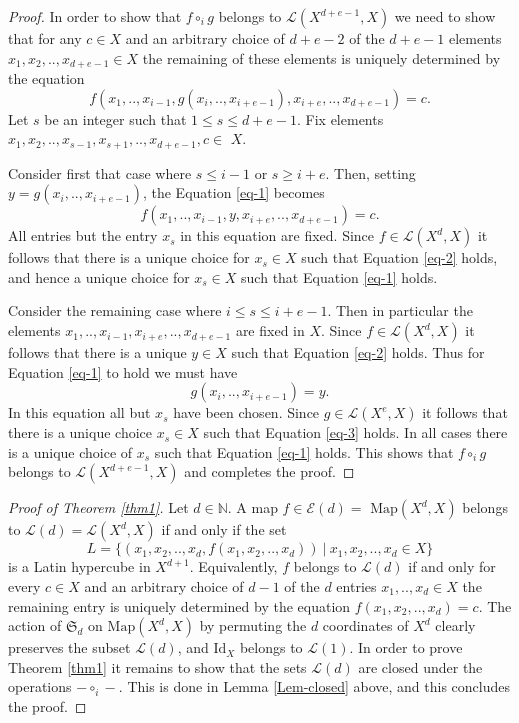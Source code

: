 \documentclass{amsart} %
\theoremstyle{plain}\newtheorem{Theorem}{Theorem}[section]
\theoremstyle{plain}\newtheorem{Conjecture}[Theorem]{Conjecture}
\theoremstyle{plain}\newtheorem{Corollary}[Theorem]{Corollary}
\theoremstyle{plain}\newtheorem{Lemma}[Theorem]{Lemma}
\theoremstyle{plain}\newtheorem{Proposition}[Theorem]{Proposition}
\theoremstyle{definition}\newtheorem{Definition}[Theorem]{Definition}
\theoremstyle{definition}\newtheorem{Example}[Theorem]{Example}
\theoremstyle{definition}\newtheorem{Examples}[Theorem]{Examples}
\theoremstyle{definition}\newtheorem{Remark}[Theorem]{Remark}
\theoremstyle{definition}\newtheorem{Remarks}[Theorem]{Remarks}
\theoremstyle{plain}\newtheorem{Statement}[Theorem]{}
\def\CE{{\mathcal{E}}}    \def\OR{{\mathcal{O}R}}
\def\CL{{\mathcal{L}}}  \def\bCL{{\mathbf{L}}}
\def\N{{\mathbb N}}
\def\Id{\mathrm{Id}}             \def\tenA{\otimes_A}
\def\Map{\mathrm{Map}}
\def\sym{\mathfrak{S}} %
\begin{document}
\begin{proof}
In order to show that
$f\circ_i g$ belongs to $\CL(X^{d+e-1},X)$ we need to show that for any $c\in X$
and an arbitrary choice of $d+e-2$ of the $d+e-1$ elements $x_1,x_2,..,x_{d+e-1}\in X$
the remaining of these elements is uniquely determined by the equation
\begin{equation}  \label{eq-1}
f(x_1,..,x_{i-1}, g(x_i,..,x_{i+e-1}), x_{i+e},..,x_{d+e-1}) = c.
\end{equation}
Let $s$ be an integer such that $1\leq s\leq d+e-1$. Fix elements
$x_1,x_2,..,x_{s-1}, x_{s+1},..,x_{d+e-1}, c \in$ $X$. 

Consider first that case where $s\leq i-1$ or $s\geq i+e$.
Then, setting $y=g(x_i,..,x_{i+e-1})$, the
Equation \ref{eq-1} becomes
\begin{equation} \label{eq-2}
f(x_1,..,x_{i-1},y,x_{i+e},..,x_{d+e-1}) = c.
\end{equation}
All entries  but the entry $x_s$ in this equation are fixed. Since $f\in\CL(X^d,X)$ it follows
that there is a unique choice for $x_s\in X$ such that Equation \ref{eq-2} holds, and
hence a unique choice for $x_s\in X$ such that Equation \ref{eq-1} holds.

Consider the remaining case where $i\leq s \leq i+e-1$. Then in particular the
elements $x_1,..,x_{i-1}, x_{i+e},..,x_{d+e-1}$ are fixed in $X$.
Since $f\in\CL(X^d,X)$ it follows that there is a unique $y\in X$ such that
Equation \ref{eq-2} holds.  Thus for Equation \ref{eq-1} to hold we must have
\begin{equation} \label{eq-3}
g(x_i,..,x_{i+e-1}) = y.
\end{equation}
In this equation all but $x_s$ have been chosen. Since $g\in\CL(X^e,X)$ it follows
that there is a unique choice $x_s\in X$ such that Equation \ref{eq-3} holds.
In all cases there is a unique choice of $x_s$ such that Equation \ref{eq-1} holds.
This shows that $f\circ_i g$ belongs to $\CL(X^{d+e-1},X)$ and completes the proof.
\end{proof}

\begin{proof}[{Proof of Theorem \ref{thm1}}]
Let $d\in \N$.  A map $f\in\CE(d)=$ $\Map(X^d,X)$ 
belongs to $\CL(d)=\CL(X^d,X)$ if and only if  the set 
$$L = \{(x_1,x_2,..,x_d, f(x_1,x_2,..,x_d))\ |\ x_1,x_2,..,x_d \in X\}$$
is a Latin hypercube in $X^{d+1}$. Equivalently, $f$ belongs to $\CL(d)$ if and only
for every  $c\in X$ and an arbitrary  choice of $d-1$ of the $d$ 
entries $x_1,..,x_d\in X$ the remaining entry is uniquely determined by the equation
$f(x_1,x_2,..,x_d)=c$. 
The action of $\sym_d$ on $\Map(X^d,X)$
by permuting the $d$ coordinates  of $X^d$ clearly preserves the subset $\CL(d)$, 
and $\Id_X$ belongs to $\CL(1)$.
In order to prove Theorem \ref{thm1} it
remains to show that the sets $\CL(d)$ are closed under the operations $-\circ_i-$.
This is done in Lemma \ref{Lem-closed} above, and
this concludes the proof.
\end{proof}
\end{document}
